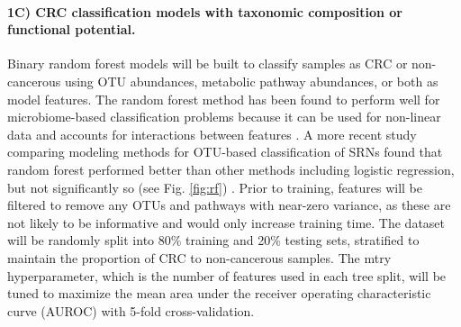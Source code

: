 \documentclass[11pt]{article}
\begin{document}
\paragraph{1C) CRC classification models with taxonomic composition or functional potential.}

\begin{figure}
    \vspace{-8pt}
\end{figure}
Binary random forest models will be built to classify samples as CRC or non-cancerous using OTU abundances, metabolic pathway abundances, or both as model features.
The random forest method has been found to perform well for microbiome-based classification problems because it can be used for non-linear data and accounts for interactions between features \cite{baxter_microbiota-based_2016}.
A more recent study comparing modeling methods for OTU-based classification of SRNs found that random forest performed better than other methods including logistic regression, but not significantly so (see Fig. \ref{fig:rf}) \cite{topcuoglu_framework_2020}.
Prior to training, features will be filtered to remove any OTUs and pathways with near-zero variance, as these are not likely to be informative and would only increase training time.
The dataset will be randomly split into 80\% training and 20\% testing sets, stratified to maintain the proportion of CRC to non-cancerous samples.
The mtry hyperparameter, which is the number of features used in each tree split, will be tuned to maximize the mean area under the receiver operating characteristic curve (AUROC) with 5-fold cross-validation.
\end{document}
